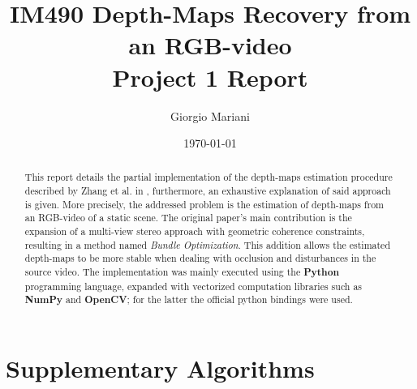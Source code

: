 \documentclass[notitlepage,english]{hgbreport}
\author{Giorgio Mariani}										%
\title{IM490 Depth-Maps Recovery from an RGB-video\\	%
				\textbf{Project 1 Report}}	%
\date{\today}
\newcommand{\Python}{\textbf{Python}}
\newcommand{\Numpy}{\textbf{NumPy}}
\newcommand{\OpenCV}{\textbf{OpenCV}}
\begin{document}

\maketitle

\begin{abstract}\noindent
	This report details the partial implementation of the depth-maps estimation procedure described by Zhang et al. in \cite{Zhang2009}, furthermore, an exhaustive explanation of said approach is given.
	More precisely, the addressed problem is the estimation of depth-maps from an RGB-video of a static scene. The original paper's main contribution is the expansion of a multi-view stereo approach with geometric coherence constraints, resulting in a method named \textit{Bundle Optimization}.  This addition allows the estimated depth-maps to be more stable when dealing with occlusion and disturbances in the source video.
	The implementation was mainly executed using the \Python{} programming language, expanded with vectorized computation libraries such as \Numpy{} and \OpenCV{}; for the latter the official python bindings were used.

\end{abstract}


\tableofcontents















\appendix %


\chapter{Supplementary Algorithms}
\end{document}
